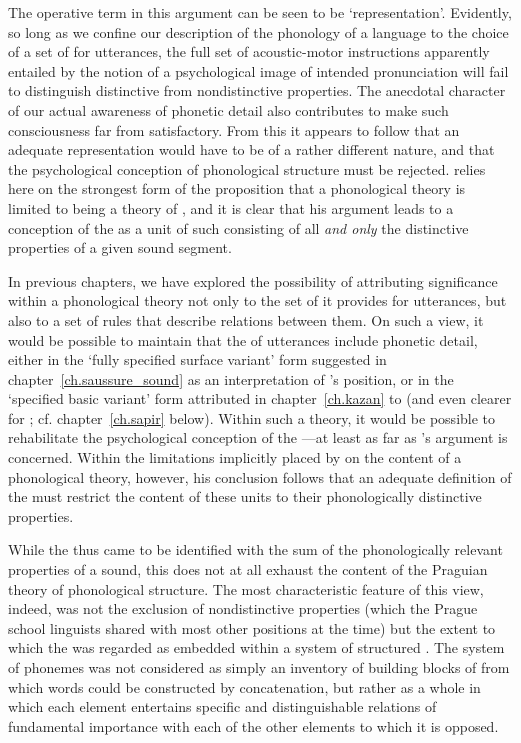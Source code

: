 The operative term in this argument can be seen to be
`representation'. Evidently, so long as we confine our description of
the phonology of a language to the choice of a set of 
for utterances, the full set of acoustic-motor instructions apparently
entailed by the notion of a psychological image of intended
pronunciation will fail to distinguish distinctive from nondistinctive
properties. The anecdotal character of our actual awareness of
phonetic detail also contributes to make such consciousness far from
satisfactory. From this it appears to follow that an adequate
representation would have to be of a rather different nature, and that
the psychological conception of phonological structure must be
rejected. {\Trubetzkoy} relies here on the strongest form of the
proposition that a phonological theory is limited to being a theory of
, and it is clear that his argument leads to a
conception of the  as a unit of such  consisting
of all \emph{and only} the distinctive properties of a given sound
segment.

In previous chapters, we have explored the possibility of attributing
significance within a phonological theory not only to the set of
 it provides for utterances, but also to a set of {rules}
that describe relations between them. On such a view, it would be
possible to maintain that the  of
utterances include phonetic detail, either in the `fully specified
surface variant' form suggested in chapter~\ref{ch.saussure_sound} as
an interpretation of {\Saussure}'s position, or in the `specified basic
variant' form attributed in chapter~\ref{ch.kazan} to {\Baudouin} (and
even clearer for {\Sapir}; cf. chapter~\ref{ch.sapir} below). Within such
a theory, it would be possible to rehabilitate the psychological
conception of the —at least as far as {\Trubetzkoy}'s argument is
concerned. Within the limitations implicitly placed by {\Trubetzkoy} on
the content of a phonological theory, however, his conclusion follows
that an adequate definition of the  must restrict the content
of these units to their phonologically distinctive properties.

While the  thus came to be identified with the sum of the
phonologically relevant properties of a sound, this does not at all
exhaust the content of the Praguian theory of phonological
structure. The most characteristic feature of this view, indeed, was
not the exclusion of nondistinctive properties (which the Prague
school linguists shared with most other positions at the time) but the
extent to which the  was regarded as embedded within a system
of structured . The system of phonemes was not considered
as simply an inventory of building blocks of  from
which words could be constructed by concatenation, but rather as a
whole in which each element entertains specific and distinguishable
relations of fundamental importance with each of the other elements to
which it is opposed.

